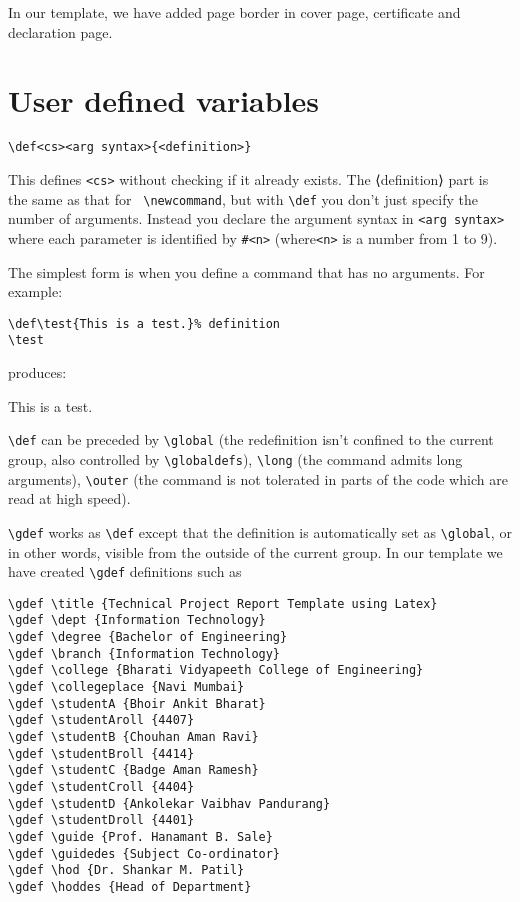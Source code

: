 In our template, we have added page border in cover page, certificate and declaration page.

\section{User defined variables}

\begin{lstlisting}
\def<cs><arg syntax>{<definition>}
\end{lstlisting}

This defines \verb|<cs>| without checking if it already exists. The ⟨definition⟩ part is the same as that for \verb| \newcommand|, but with \verb|\def| you don't just specify the number of arguments. Instead you declare the argument syntax in \verb|<arg syntax>| where each parameter is identified by \verb|#<n>| (where\verb|<n>| is a number from 1 to 9).

The simplest form is when you define a command that has no arguments. For example:

\begin{lstlisting}
\def\test{This is a test.}% definition
\test
\end{lstlisting}

produces:

\def\test{This is a test.}%
\test

\verb|\def| can be preceded by \verb|\global| (the redefinition isn't confined to the current group, also controlled by \verb|\globaldefs|), \verb|\long| (the command admits long arguments), \verb|\outer| (the command is not tolerated in parts of the code which are read at high speed).

\verb|\gdef| works as \verb|\def| except that the definition is automatically set as \verb|\global|, or in other words, visible from the outside of the current group. In our template we have created \verb|\gdef| definitions such as

\begin{lstlisting}
\gdef \title {Technical Project Report Template using Latex} 
\gdef \dept {Information Technology} 
\gdef \degree {Bachelor of Engineering} 
\gdef \branch {Information Technology} 
\gdef \college {Bharati Vidyapeeth College of Engineering} 
\gdef \collegeplace {Navi Mumbai} 
\gdef \studentA {Bhoir Ankit Bharat} 
\gdef \studentAroll {4407} 
\gdef \studentB {Chouhan Aman Ravi} 
\gdef \studentBroll {4414} 
\gdef \studentC {Badge Aman Ramesh} 
\gdef \studentCroll {4404} 
\gdef \studentD {Ankolekar Vaibhav Pandurang} 
\gdef \studentDroll {4401} 
\gdef \guide {Prof. Hanamant B. Sale}
\gdef \guidedes {Subject Co-ordinator}
\gdef \hod {Dr. Shankar M. Patil} 
\gdef \hoddes {Head of Department} 
\end{lstlisting}